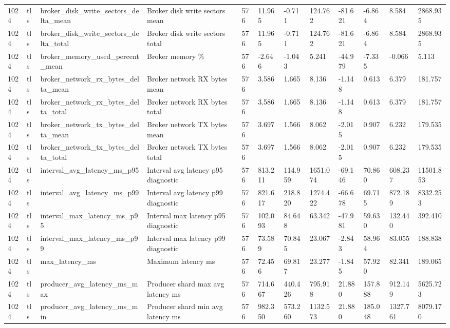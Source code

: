 \begin{longtable}{llllllllllll}
1024 & tls & broker\_disk\_write\_sectors\_delta\_mean & Broker disk write sectors mean & 576 & 11.965 & -0.711 & 124.762 & -81.621 & -6.864 & 8.584 & 2868.935 \\
1024 & tls & broker\_disk\_write\_sectors\_delta\_total & Broker disk write sectors total & 576 & 11.965 & -0.711 & 124.762 & -81.621 & -6.864 & 8.584 & 2868.935 \\
1024 & tls & broker\_memory\_used\_percent\_mean & Broker memory \% & 576 & -2.646 & -1.043 & 5.241 & -44.979 & -7.335 & -0.066 & 5.113 \\
1024 & tls & broker\_network\_rx\_bytes\_delta\_mean & Broker network RX bytes mean & 576 & 3.586 & 1.665 & 8.136 & -1.148 & 0.613 & 6.379 & 181.757 \\
1024 & tls & broker\_network\_rx\_bytes\_delta\_total & Broker network RX bytes total & 576 & 3.586 & 1.665 & 8.136 & -1.148 & 0.613 & 6.379 & 181.757 \\
1024 & tls & broker\_network\_tx\_bytes\_delta\_mean & Broker network TX bytes mean & 576 & 3.697 & 1.566 & 8.062 & -2.015 & 0.907 & 6.232 & 179.535 \\
1024 & tls & broker\_network\_tx\_bytes\_delta\_total & Broker network TX bytes total & 576 & 3.697 & 1.566 & 8.062 & -2.015 & 0.907 & 6.232 & 179.535 \\
1024 & tls & interval\_avg\_latency\_ms\_p95 & Interval avg latency p95 diagnostic & 576 & 813.211 & 114.959 & 1651.074 & -69.146 & 70.860 & 608.237 & 11501.853 \\
1024 & tls & interval\_avg\_latency\_ms\_p99 & Interval avg latency p99 diagnostic & 576 & 821.617 & 218.820 & 1274.422 & -66.678 & 69.715 & 872.189 & 8332.253 \\
1024 & tls & interval\_max\_latency\_ms\_p95 & Interval max latency p95 diagnostic & 576 & 102.093 & 84.648 & 63.342 & -47.981 & 59.630 & 132.440 & 392.410 \\
1024 & tls & interval\_max\_latency\_ms\_p99 & Interval max latency p99 diagnostic & 576 & 73.589 & 70.845 & 23.067 & -2.843 & 58.964 & 83.055 & 188.838 \\
1024 & tls & max\_latency\_ms & Maximum latency ms & 576 & 72.456 & 69.817 & 23.277 & -1.845 & 57.920 & 82.341 & 189.065 \\
1024 & tls & producer\_avg\_latency\_ms\_max & Producer shard max avg latency ms & 576 & 714.667 & 440.426 & 795.918 & 21.880 & 157.888 & 912.149 & 5625.723 \\
1024 & tls & producer\_avg\_latency\_ms\_min & Producer shard min avg latency ms & 576 & 982.350 & 573.260 & 1132.573 & 21.880 & 185.048 & 1327.761 & 8079.170 \\

\end{longtable}
